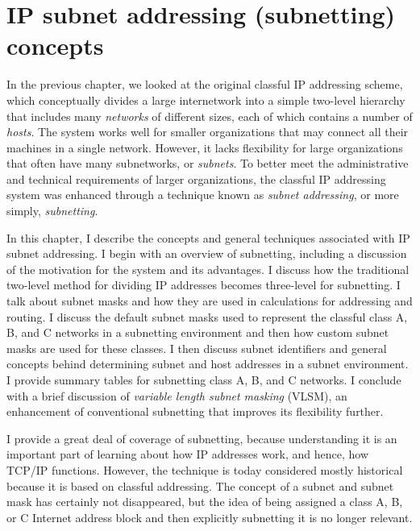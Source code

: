\chapter{IP subnet addressing (subnetting) concepts}
\label{chap:kozierok-ch18}

In the previous chapter, we looked at the original classful IP
addressing scheme, which conceptually divides a large internetwork into
a simple two-level hierarchy that includes many {\emph{networks}} of
different sizes, each of which contains a number of {\emph{hosts}}. The
system works well for smaller organizations that may connect all their
machines in a single network. However, it lacks flexibility for large
organizations that often have many subnetworks, or {\emph{subnets}}. To
better meet the administrative and technical requirements of larger
organizations, the classful IP addressing system was enhanced through a
technique known as {\emph{subnet addressing}}, or more simply,
{\emph{subnetting}}.

In this chapter, I describe the concepts and general techniques
associated with IP subnet addressing. I begin with an overview of
subnetting, including a discussion of the motivation for the system and
its advantages. I discuss how the traditional two-level method for
dividing IP addresses becomes three-level for subnetting. I talk about
subnet masks and how they are used in calculations for addressing and
routing. I discuss the default subnet masks used to represent the
classful class A, B, and C networks in a subnetting environment and then
how custom subnet masks are used for these classes.
I then discuss subnet identifiers and general concepts behind determining subnet and host addresses in a subnet environment.
I provide summary tables for subnetting class A, B, and C networks.
I conclude with a brief discussion of \emph{variable length subnet masking} (VLSM), an enhancement of conventional subnetting that improves its flexibility further.

\begin{note}
I provide a great deal of coverage of subnetting, because
understanding it is an important part of learning about how IP addresses
work, and hence, how TCP/IP functions. However, the technique is today
considered mostly historical because it is based on classful
addressing. The concept of a subnet and subnet mask has certainly not
disappeared, but the idea of being assigned a class A, B, or C Internet
address block and then explicitly subnetting it is no longer relevant.
\end{note}


